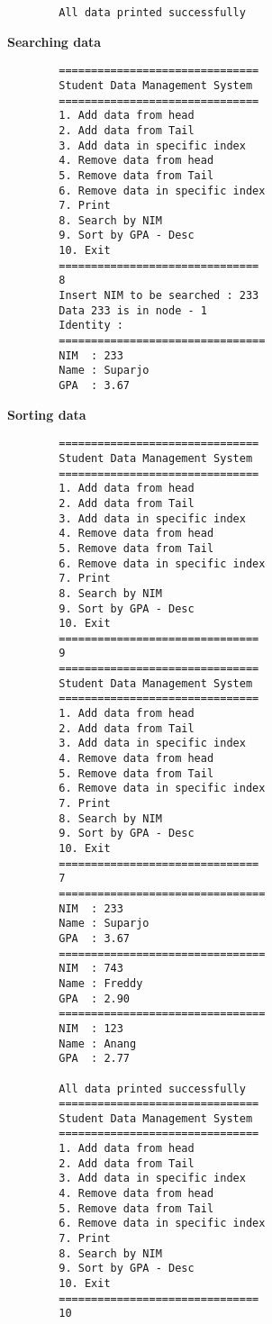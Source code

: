 \documentclass[12pt,titlepage]{article}
\begin{document}
\begin{enumerate}
\begin{verbatim}
        All data printed successfully
    \end{verbatim}
    \textbf{Searching data}
    \begin{verbatim}
        ===============================
        Student Data Management System
        ===============================
        1. Add data from head
        2. Add data from Tail
        3. Add data in specific index
        4. Remove data from head
        5. Remove data from Tail
        6. Remove data in specific index
        7. Print
        8. Search by NIM
        9. Sort by GPA - Desc
        10. Exit
        ===============================
        8
        Insert NIM to be searched : 233
        Data 233 is in node - 1
        Identity :
        ================================
        NIM  : 233
        Name : Suparjo
        GPA  : 3.67
    \end{verbatim}
    \textbf{Sorting data}
    \begin{verbatim}
        ===============================
        Student Data Management System
        ===============================
        1. Add data from head
        2. Add data from Tail
        3. Add data in specific index
        4. Remove data from head
        5. Remove data from Tail
        6. Remove data in specific index
        7. Print
        8. Search by NIM
        9. Sort by GPA - Desc
        10. Exit
        ===============================
        9
        =============================== 
        Student Data Management System
        ===============================
        1. Add data from head
        2. Add data from Tail
        3. Add data in specific index
        4. Remove data from head
        5. Remove data from Tail
        6. Remove data in specific index
        7. Print
        8. Search by NIM
        9. Sort by GPA - Desc
        10. Exit
        ===============================
        7
        ================================
        NIM  : 233
        Name : Suparjo
        GPA  : 3.67
        ================================
        NIM  : 743
        Name : Freddy
        GPA  : 2.90
        ================================
        NIM  : 123
        Name : Anang
        GPA  : 2.77

        All data printed successfully
        ===============================
        Student Data Management System
        ===============================
        1. Add data from head
        2. Add data from Tail
        3. Add data in specific index
        4. Remove data from head
        5. Remove data from Tail
        6. Remove data in specific index
        7. Print
        8. Search by NIM
        9. Sort by GPA - Desc
        10. Exit
        ===============================
        10
    \end{verbatim}


\end{enumerate}
\end{document}
